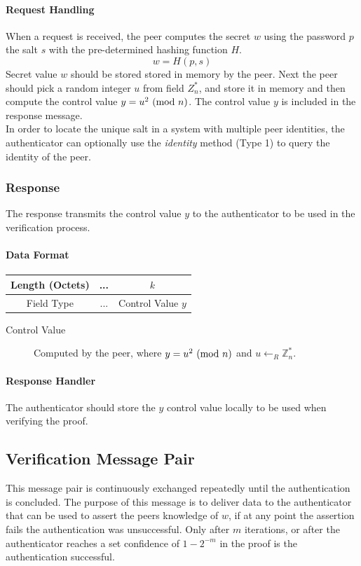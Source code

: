 \paragraph{Request Handling} When a request is received, the peer computes the secret $w$ using the password $p$ the salt $s$ with the pre-determined hashing function $H$.
$$w = H(p, s)$$
Secret value $w$ should be stored stored in memory by the peer. 
Next the peer should pick a random integer $u$ from field $Z^*_n$, and store it in memory and then compute the control value $y = u^2 \ (\mathrm{mod}\ n)$.
The control value $y$ is included in the response message.
\bigskip
\\
In order to locate the unique salt in a system with multiple peer identities, the authenticator can optionally use the \textit{identity} method (Type 1) to query the identity of the peer.


\subsubsection{Response}
The response transmits the control value $y$ to the authenticator to be used in the verification process.

\paragraph{Data Format}

\begin{center}
\begin{tabular}{|c|c|c|}
	\hline
	Length (Octets) & ... & $k$ \\
	\hline
	Field Type & ... & Control Value $y$\\
	\hline
\end{tabular}
\end{center}

\bigskip

\begin{description}
	\item[Control Value] Computed by the peer, where $y = u^2 \ (\mathrm{mod}\ n)$ and $u \leftarrow_R \mathbb{Z}^*_n$.
\end{description}

\paragraph{Response Handler}
The authenticator should store the $y$ control value locally to be used when verifying the proof.

\subsection{Verification Message Pair}
This message pair is continuously exchanged repeatedly until the authentication is concluded.
The purpose of this message is to deliver data to the authenticator that can be used to assert the peers knowledge of $w$, if at any point the assertion fails the authentication was unsuccessful.
Only after $m$ iterations, or after the authenticator reaches a set confidence of $1 - 2^{-m}$ in the proof is the authentication successful.

